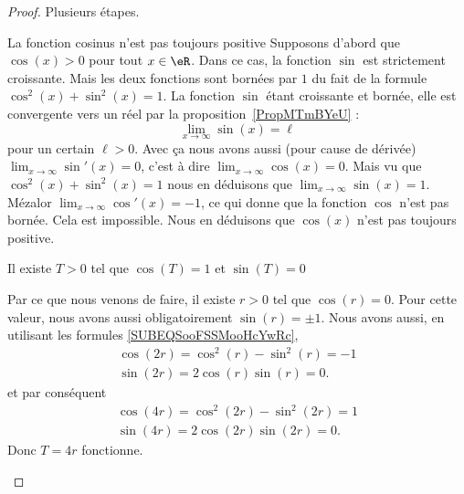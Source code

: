 \begin{proof}
    Plusieurs étapes.
    \begin{subproof}
        \item[La fonction cosinus n'est pas toujours positive]
    Supposons d'abord que \( \cos(x)>0\) pour tout \( x\in \eR\). Dans ce cas, la fonction \( \sin\) est strictement croissante. Mais les deux fonctions sont bornées par \( 1\) du fait de la formule \( \cos^2(x)+\sin^2(x)=1\). La fonction \( \sin\) étant croissante et bornée, elle est convergente vers un réel par la proposition~\ref{PropMTmBYeU} :
    \begin{equation}
        \lim_{x\to \infty} \sin(x)=\ell
    \end{equation}
    pour un certain \( \ell>0\). Avec ça nous avons aussi (pour cause de dérivée) \( \lim_{x\to \infty} \sin'(x)=0\), c'est à dire \( \lim_{x\to \infty} \cos(x)=0\). Mais vu que \( \cos^2(x)+\sin^2(x)=1\) nous en déduisons que \( \lim_{x\to \infty} \sin(x)=1\). Mézalor \( \lim_{x\to \infty} \cos'(x)=-1\), ce qui donne que la fonction \( \cos\) n'est pas bornée. Cela est impossible. Nous en déduisons que \( \cos(x)\) n'est pas toujours positive.

\item[Il existe \( T>0\) tel que \( \cos(T)=1\) et \( \sin(T)=0\)]

    Par ce que nous venons de faire, il existe \( r>0\) tel que \( \cos(r)=0\). Pour cette valeur, nous avons aussi obligatoirement \( \sin(r)=\pm 1\). Nous avons aussi, en utilisant les formules \eqref{SUBEQSooFSSMooHcYwRc},
    \begin{subequations}
        \begin{align}
            \cos(2r)=\cos^2(r)-\sin^2(r)=-1\\
            \sin(2r)=2\cos(r)\sin(r)=0.
        \end{align}
    \end{subequations}
    et par conséquent
    \begin{subequations}
        \begin{align}
            \cos(4r)=\cos^2(2r)-\sin^2(2r)=1\\
            \sin(4r)=2\cos(2r)\sin(2r)=0.
        \end{align}
    \end{subequations}
    Donc \( T=4r\) fonctionne.


\end{subproof}
\end{proof}

